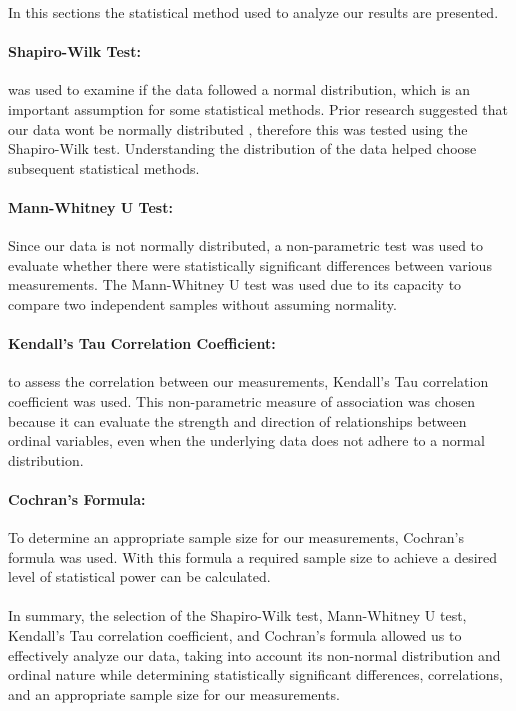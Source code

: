 In this sections the statistical method used to analyze our results are presented. 

\paragraph{Shapiro-Wilk Test:} was used to examine if the data followed a normal distribution, which is an important assumption for some statistical methods. Prior research suggested that our data wont be normally distributed \cite{biksbois}, therefore this was tested using the Shapiro-Wilk test. Understanding the distribution of the data helped choose subsequent statistical methods.

\paragraph{Mann-Whitney U Test:}
Since our data is not normally distributed, a non-parametric test was used to evaluate whether there were statistically significant differences between various measurements. The Mann-Whitney U test was used due to its capacity to compare two independent samples without assuming normality.

\paragraph{Kendall's Tau Correlation Coefficient:}
to assess the correlation between our measurements, Kendall's Tau correlation coefficient was used. This non-parametric measure of association was chosen because it can evaluate the strength and direction of relationships between ordinal variables, even when the underlying data does not adhere to a normal distribution. %

\paragraph{Cochran's Formula:}
To determine an appropriate sample size for our measurements, Cochran's formula was used. With this formula a required sample size to achieve a desired level of statistical power can be calculated.

\paragraph{}
In summary, the selection of the Shapiro-Wilk test, Mann-Whitney U test, Kendall's Tau correlation coefficient, and Cochran's formula allowed us to effectively analyze our data, taking into account its non-normal distribution and ordinal nature while determining statistically significant differences, correlations, and an appropriate sample size for our measurements.
